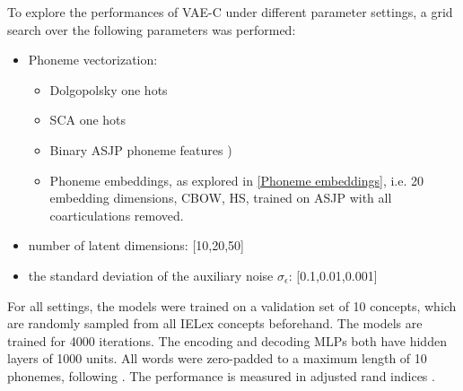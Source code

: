 \documentclass[6pt]{article}
\begin{document}
To explore the performances of VAE-C under different parameter settings, a grid search over the following parameters was performed:
\begin{itemize}
\item Phoneme vectorization:  \begin{itemize}
\item Dolgopolsky one hots \citep{dolgopolsky1986probabilistic,list2012sca}
\item SCA one hots \citep{list2012sca}
\item Binary ASJP phoneme features \citep{rama2016siamese})
\item Phoneme embeddings, as explored in \ref{Phoneme embeddings}, i.e. 20 embedding dimensions, CBOW, HS, trained on ASJP with all coarticulations removed. 
\end{itemize}
\item number of latent dimensions:  [10,20,50]
\item the standard deviation of the auxiliary noise $\sigma_{\epsilon}$: [0.1,0.01,0.001]
\end{itemize}
For all settings, the models were trained on a validation set of 10 concepts, which are randomly sampled from all IELex concepts beforehand. The models are trained for 4000 iterations. The encoding and decoding MLPs both have hidden layers of 1000 units. All words were zero-padded to a maximum length of 10 phonemes, following \citep{rama2016siamese}. The performance is measured in adjusted rand indices \citep{rand1971objective,hubert1985comparing}. 
\end{document}
